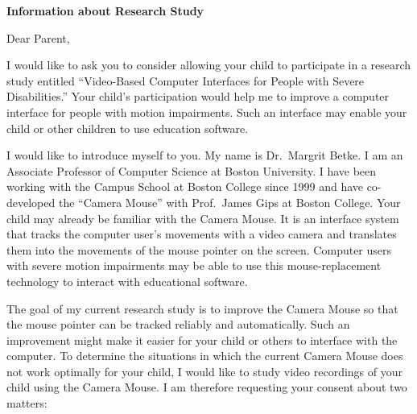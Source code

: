 
\setlength{\textheight}{9.5in}
\setlength{\footheight}{0.0in}
\setlength{\topmargin}{0in}   %
\setlength{\headheight}{0.0in}
\setlength{\headsep}{0.0in}
\setlength{\textwidth}{6.6in}
\setlength{\oddsidemargin}{0in}
\setlength{\parindent}{0pc}
\setlength{\parskip}{6pt plus 1.5pt minus 1.5pt}


\signature{\vspace*{-.7cm} Margrit Betke, Ph.D. \\ Associate
Professor}


\pagestyle{empty}

\begin{letter}



{\large \centerline{\bf Information about Research Study}


Dear Parent,}

I would like to ask you to consider allowing your child to participate
in a research study entitled ``Video-Based Computer Interfaces for
People with Severe Disabilities.''  Your child's participation would
help me to improve a computer interface for people with motion
impairments.  Such an interface may enable your child or other
children to use education software.

I would like to introduce myself to you.  My name is Dr.\ Margrit
Betke.  I am an Associate Professor of Computer Science at Boston
University.  I have been working with the Campus School at Boston
College since 1999 and have co-developed the ``Camera Mouse'' with
Prof.\ James Gips at Boston College.  Your child may already be
familiar with the Camera Mouse.  It is an interface system that tracks
the computer user's movements with a video camera and translates them
into the movements of the mouse pointer on the screen.  Computer users
with severe motion impairments may be able to use this
mouse-replacement technology to interact with educational software.

The goal of my current research study is to improve the Camera Mouse
so that the mouse pointer can be tracked reliably and
automatically. Such an improvement might make it easier for your child
or others to interface with the computer.  To determine the situations
in which the current Camera Mouse does not work optimally for your
child, I would like to study video recordings of your child using the
Camera Mouse.  I am therefore requesting your consent about two
matters:


\end{letter}
